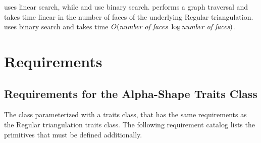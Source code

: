  uses linear search, while 
 and  
use binary search.
 performs a graph traversal and takes time linear in the number of faces of the underlying Regular triangulation.
 uses binary search and takes time
$O(\mbox{\em number of faces } \log{\mbox{\em number of faces}})$.


\section{Requirements\label{I2_SectRequirements}}


\subsection{Requirements for the Alpha-Shape Traits Class} 

The class  parameterized with a
traits class, that has the same requirements as the Regular
triangulation traits class.  The following requirement catalog lists
the primitives that must be defined additionally.

